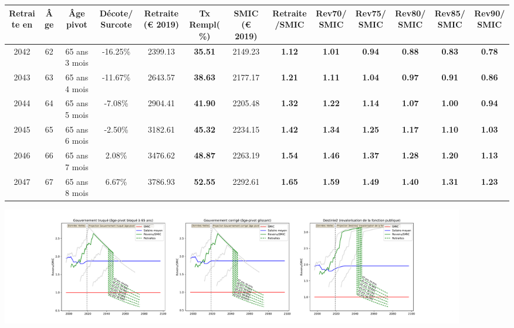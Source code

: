 { \scriptsize \begin{center} 
\begin{tabular}[htb]{|c|c||c|c||c|c||c||c|c|c|c|c|c|} 
\hline 
 Retraite en &  Âge &  Âge pivot &  Décote/Surcote &  Retraite (\euro{} 2019) &  Tx Rempl(\%) &  SMIC (\euro{} 2019) &  Retraite/SMIC &  Rev70/SMIC &  Rev75/SMIC &  Rev80/SMIC &  Rev85/SMIC &  Rev90/SMIC \\ 
\hline \hline 
 2042 &  62 &  65 ans 3 mois &  -16.25\% &  2399.13 &  {\bf 35.51} &  2149.23 &  {\bf 1.12} &  {\bf 1.01} &  {\bf {\color{red} 0.94}} &  {\bf {\color{red} 0.88}} &  {\bf {\color{red} 0.83}} &  {\bf {\color{red} 0.78}} \\ 
\hline 
 2043 &  63 &  65 ans 4 mois &  -11.67\% &  2643.57 &  {\bf 38.63} &  2177.17 &  {\bf 1.21} &  {\bf 1.11} &  {\bf 1.04} &  {\bf {\color{red} 0.97}} &  {\bf {\color{red} 0.91}} &  {\bf {\color{red} 0.86}} \\ 
\hline 
 2044 &  64 &  65 ans 5 mois &  -7.08\% &  2904.41 &  {\bf 41.90} &  2205.48 &  {\bf 1.32} &  {\bf 1.22} &  {\bf 1.14} &  {\bf 1.07} &  {\bf 1.00} &  {\bf {\color{red} 0.94}} \\ 
\hline 
 2045 &  65 &  65 ans 6 mois &  -2.50\% &  3182.61 &  {\bf 45.32} &  2234.15 &  {\bf 1.42} &  {\bf 1.34} &  {\bf 1.25} &  {\bf 1.17} &  {\bf 1.10} &  {\bf 1.03} \\ 
\hline 
 2046 &  66 &  65 ans 7 mois &  2.08\% &  3476.62 &  {\bf 48.87} &  2263.19 &  {\bf 1.54} &  {\bf 1.46} &  {\bf 1.37} &  {\bf 1.28} &  {\bf 1.20} &  {\bf 1.13} \\ 
\hline 
 2047 &  67 &  65 ans 8 mois &  6.67\% &  3786.93 &  {\bf 52.55} &  2292.61 &  {\bf 1.65} &  {\bf 1.59} &  {\bf 1.49} &  {\bf 1.40} &  {\bf 1.31} &  {\bf 1.23} \\ 
\hline 
\hline 
\end{tabular} 
\end{center} } 

 \begin{center}\includegraphics[width=0.9\textwidth]{fig/ProfAgrege_1980_22_dest_retraite.pdf}\end{center} \label{fig/ProfAgrege_1980_22_dest_retraite.pdf} 

